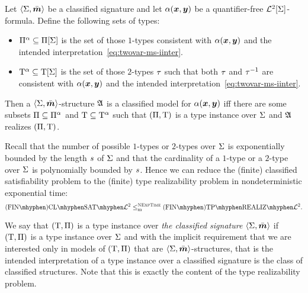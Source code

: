 \begin{remark}\label{rem:red-sat-to-real}
Let $\left\langle \mathrm{\Sigma},\bar{\bm{m}} \right\rangle$ be a classified signature and let $\alpha(\bm{x},\bm{y})$ be a
quantifier-free $\mathcal{L}^{2}[\mathrm{\Sigma}]$-formula.
Define the following sets of types:
\begin{itemize}
  \item $\Pi^\alpha \subseteq \Pi[\mathrm{\Sigma}]$ is the set of those $1$-types
  consistent with $\alpha(\bm{x},\bm{y})$ and the intended
  interpretation~\cref{eq:twovar-ms-iinter}.
  \item $\mathrm{T}^\alpha \subseteq \mathrm{T}[\mathrm{\Sigma}]$ is the set of those $2$-types $\tau$
  such that both $\tau$ and $\tau^{-1}$ are consistent with $\alpha(\bm{x},\bm{y})$
  and the intended interpretation~\cref{eq:twovar-ms-iinter}.
\end{itemize}
Then a $\left\langle \mathrm{\Sigma},\bar{\bm{m}} \right\rangle$-structure $\mathfrak{A}$ is a classified model for
$\alpha(\bm{x},\bm{y})$ iff there are some subsets $\Pi \subseteq \Pi^\alpha$ and
$\mathrm{T} \subseteq \mathrm{T}^\alpha$ such that $(\Pi,\mathrm{T})$ is a type instance
over $\mathrm{\Sigma}$ and $\mathfrak{A}$ realizes $(\Pi,\mathrm{T})$.

Recall that the number of possible $1$-types or $2$-types over $\mathrm{\Sigma}$ is
exponentially bounded by the length $s$ of $\mathrm{\Sigma}$ and that the cardinality
of a $1$-type or a $2$-type over $\mathrm{\Sigma}$ is polynomially bounded by $s$.
Hence we can reduce the (finite) classified satisfiability problem to the
(finite) type realizability problem in nondeterministic exponential time:
\[
  \FinAClSat{\vFo2} \red\cNExpTime \FinAReal{\vFo2}.
\]
\end{remark}

\begin{definition}
We say that $(\mathrm{T},\Pi)$ is a type instance over \emph{the classified
signature} $\left\langle \mathrm{\Sigma},\bar{\bm{m}} \right\rangle$ if $(\mathrm{T},\Pi)$ is a type instance over $\mathrm{\Sigma}$
and with the implicit requirement that we are interested only in models of
$(\mathrm{T},\Pi)$ that are $\left\langle \mathrm{\Sigma},\bar{\bm{m}} \right\rangle$-structures, that is the intended
interpretation of a type instance over a classified signature is the class of
classified structures. Note that this is exactly the content of the type
realizability problem.
\end{definition}

